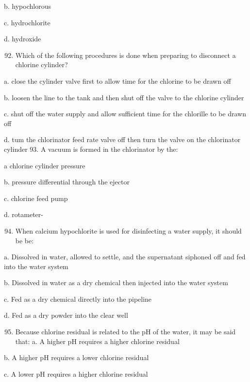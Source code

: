 \documentclass[10pt]{article}
\begin{document}
\begin{enumerate}
\begin{enumerate}
b. hypochlorous

c. hydrochlorite

d. hydroxide

\begin{enumerate}
  \setcounter{enumi}{91}
  \item Which of the following procedures is done when preparing to disconnect a chlorine cylinder?
\end{enumerate}

a. close the cylinder valve first to allow time for the chlorine to be drawn off

b. loosen the line to the tank and then shut off the valve to the chlorine cylinder

c. shut off the water supply and allow sufficient time for the chlorille to be drawn off

d. tum the chlorinator feed rate valve off then turn the valve on the chlorinator cylinder 93. A vacuum is formed in the chlorinator by the:

a chlorine cylinder pressure

b. pressure differential through the ejector

c. chlorine feed pump

d. rotameter-

\begin{enumerate}
  \setcounter{enumi}{93}
  \item When calcium hypochlorite is used for disinfecting a water supply, it should be be:
\end{enumerate}

a. Dissolved in water, allowed to settle, and the supernatant siphoned off and fed into the water system

b. Dissolved in water as a dry chemical then injected into the water system

c. Fed as a dry chemical directly into the pipeline

d. Fed as a dry powder into the clear well

\begin{enumerate}
  \setcounter{enumi}{94}
  \item Because chlorine residual is related to the $\mathrm{pH}$ of the water, it may be said that: a. A higher $\mathrm{pH}$ requires a higher chlorine residual
\end{enumerate}

b. A higher $\mathrm{pH}$ requires a lower chlorine residual

c. A lower $\mathrm{pH}$ requires a higher chlorine residual


\end{enumerate}
\end{enumerate}
\end{document}
